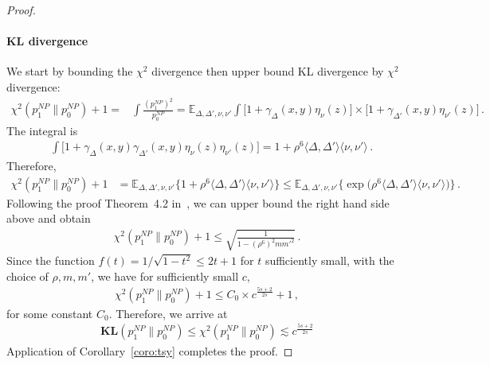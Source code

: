 \documentclass{article}
\theoremstyle{definition}
\theoremstyle{definition}
\theoremstyle{definition}
\theoremstyle{definition}
\theoremstyle{definition}
\theoremstyle{definition}
\theoremstyle{remark}
\theoremstyle{remark}
\newcommand{\E}{\mathbb{E}}
\begin{document}
\begin{proof}
    \paragraph{KL divergence}
    We start by bounding the $\chi^2$ divergence then upper bound KL divergence by $\chi^2$ divergence:
    \begin{align*}
        \chi^2(p_1^{NP}\| p_0^{NP}) + 1 = & \int \frac{(p_1^{NP})^2}{p_0^{NP}} =   \E_{\Delta,\Delta',\nu,\nu'}\int \bigg[1 + \gamma_{\Delta}(x,y)\eta_\nu(z)
        \bigg] \times \bigg[1 + \gamma_{\Delta'}(x,y)\eta_{\nu'}(z)
        \bigg] \,.
    \end{align*}
    The integral is
    \begin{align*}
        & \int \bigg[1 + \gamma_{\Delta}(x,y)\gamma_{\Delta'}(x,y)\eta_{\nu}(z)\eta_{\nu'}(z) \bigg] 
        =  1 + \rho^6\langle \Delta,\Delta' \rangle\langle \nu,\nu'\rangle \,.
    \end{align*}
    Therefore,
    \begin{align*}
        \chi^2(p_1^{NP}\| p_0^{NP}) + 1 & =   \E_{\Delta,\Delta',\nu,\nu'}\bigg\{  1 + \rho^6\langle \Delta,\Delta' \rangle\langle \nu,\nu'\rangle  \bigg\}  \le \E_{\Delta,\Delta',\nu,\nu'}\bigg\{  \exp\bigg( \rho^6\langle \Delta,\Delta' \rangle\langle \nu,\nu'\rangle \bigg)\bigg\} \,.
    \end{align*}
    Following the proof Theorem~4.2 in~\citet{neykov2021minimax}, we can upper bound the right hand side above and obtain
    \begin{align*}
        \chi^2(p_1^{NP}\| p_0^{NP}) + 1 \le\sqrt{\frac{1}{1 - (\rho^6)^2m{m'}^2}} \,.
    \end{align*}
    Since the function $f(t)=1 / \sqrt{1-t^2} \le 2t + 1$ for $t$ sufficiently small, with the choice of $\rho,m,m'$, we have for sufficiently small $c$,
    \begin{align*}
        \chi^2(p_1^{NP}\| p_0^{NP}) + 1 \le C_0 \times c^{\frac{5s+2}{2s}} + 1 \,,
    \end{align*}
    for some constant $C_0$. Therefore, we arrive at
    \begin{align*}
        \mathbf{KL}(p_1^{NP}\| p_0^{NP}) \le \chi^2(p_1^{NP}\|p_0^{NP}) \lesssim c^{\frac{5s+2}{2s}}
    \end{align*}
    Application of Corollary~\ref{coro:tsy} completes the proof.
\end{proof}


    
    

    
\end{document}
